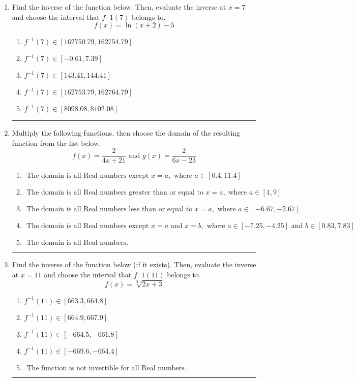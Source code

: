 \documentclass[14pt]{extbook}
\newcommand{\litem}[1]{\item#1\hspace*{-1cm}\rule{\textwidth}{0.4pt}}
\begin{document}
\begin{enumerate}
{\begin{enumerate}[label=\Alph*.]
\end{enumerate} }
\litem{
Find the inverse of the function below. Then, evaluate the inverse at $x = 7$ and choose the interval that $f^-1(7)$ belongs to.\[ f(x) = \ln{(x+2)}-5 \]\begin{enumerate}[label=\Alph*.]
\item \( f^{-1}(7) \in [162750.79, 162754.79] \)
\item \( f^{-1}(7) \in [-0.61, 7.39] \)
\item \( f^{-1}(7) \in [143.41, 144.41] \)
\item \( f^{-1}(7) \in [162753.79, 162764.79] \)
\item \( f^{-1}(7) \in [8098.08, 8102.08] \)

\end{enumerate} }
\litem{
Multiply the following functions, then choose the domain of the resulting function from the list below.\[ f(x) = \frac{2}{4x+21} \text{ and } g(x) = \frac{2}{6x-23} \]\begin{enumerate}[label=\Alph*.]
\item \( \text{ The domain is all Real numbers except } x = a, \text{ where } a \in [0.4, 11.4] \)
\item \( \text{ The domain is all Real numbers greater than or equal to } x = a, \text{ where } a \in [1, 9] \)
\item \( \text{ The domain is all Real numbers less than or equal to } x = a, \text{ where } a \in [-6.67, -2.67] \)
\item \( \text{ The domain is all Real numbers except } x = a \text{ and } x = b, \text{ where } a \in [-7.25, -4.25] \text{ and } b \in [0.83, 7.83] \)
\item \( \text{ The domain is all Real numbers. } \)

\end{enumerate} }
\litem{
Find the inverse of the function below (if it exists). Then, evaluate the inverse at $x = 11$ and choose the interval that $f^-1(11)$ belongs to.\[ f(x) = \sqrt[3]{2 x + 3} \]\begin{enumerate}[label=\Alph*.]
\item \( f^{-1}(11) \in [663.3, 664.8] \)
\item \( f^{-1}(11) \in [664.9, 667.9] \)
\item \( f^{-1}(11) \in [-664.5, -661.8] \)
\item \( f^{-1}(11) \in [-669.6, -664.4] \)
\item \( \text{ The function is not invertible for all Real numbers. } \)


\end{enumerate}}
\end{enumerate}
\end{document}
